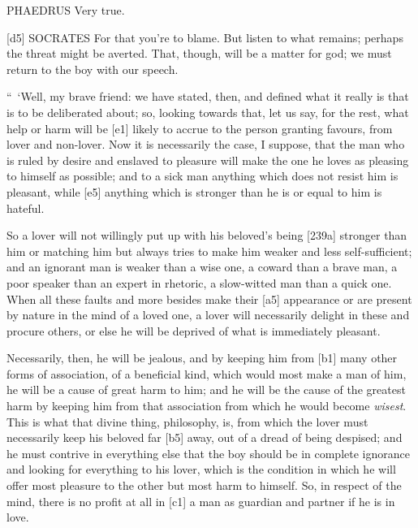 PHAEDRUS Very true.

{[}d5{]} SOCRATES For that you're to blame. But listen to what remains;
perhaps the threat might be averted. That, though, will be a matter for
god; we must return to the boy with our speech.

“~‘Well, my brave friend:
we have stated, then, and defined what it really is that is to be
deliberated about; so, looking towards that, let us say, for the rest,
what help or harm will be {[}e1{]} likely to accrue to the person
granting favours, from lover and non-lover. Now it is
necessarily the case, I
suppose, that the man who is ruled by desire and enslaved to pleasure
will make the one he loves as pleasing to himself as possible; and to a
sick man anything which does not resist him is pleasant, while {[}e5{]}
anything which is stronger than he is or equal to him is hateful.

So a lover will not willingly put up with his beloved's being {[}239a{]}
stronger than him or matching him but always tries to make him weaker
and less self-sufficient; and an ignorant man is weaker than a wise one,
a coward than a brave man, a poor speaker than an expert in rhetoric, a
slow-witted man than a quick one. When all these faults and more besides
make their {[}a5{]} appearance or are present by nature in the mind of a
loved one, a lover will necessarily delight in these and procure others,
or else he will be deprived of what is immediately pleasant.

Necessarily, then, he will be jealous, and by keeping him from {[}b1{]}
many other forms of association, of a beneficial kind, which would most
make a man of him, he will be a cause of great harm to him; and he will
be the cause of the greatest harm by keeping him from that association
from which he would become
{\em wisest}. This is
what that divine thing, philosophy, is, from which the lover must
necessarily keep his beloved far {[}b5{]} away, out of a dread of being
despised; and he must contrive in everything else that the boy should be
in complete ignorance and looking for everything to his lover, which is
the condition in which he will offer most pleasure to the other but most
harm to himself. So, in respect of the mind, there is no profit at all
in {[}c1{]} a man as guardian and partner if he is in love.

